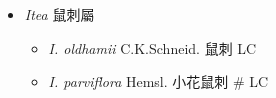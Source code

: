 
  \begin{itemize}
 \item[] \textit{Itea} 鼠刺屬
                                
  \begin{itemize}
        \item[] \textit{I. oldhamii} C.K.Schneid.  鼠刺   LC
        \item[] \textit{I. parviflora} Hemsl.  小花鼠刺  \# LC
  \end{itemize}
  \end{itemize}
